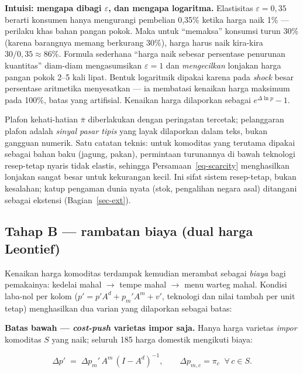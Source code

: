 \documentclass[
  manuscript=article,
  layout=publish,
  year=2026,
  volume=1,
]{den}
\begin{document}
\begin{intuisi}

\textbf{Intuisi: mengapa dibagi \(\varepsilon\), dan mengapa logaritma.}
Elastisitas \(\varepsilon = 0{,}35\) berarti konsumen hanya mengurangi
pembelian 0,35\% ketika harga naik 1\% --- perilaku khas bahan pangan
pokok. Maka untuk ``memaksa'' konsumsi turun 30\% (karena barangnya
memang berkurang 30\%), harga harus naik kira-kira
\(30/0{,}35 \approx 86\%\). Formula sederhana ``harga naik sebesar
persentase penurunan kuantitas'' diam-diam mengasumsikan
\(\varepsilon = 1\) dan \emph{mengecilkan} lonjakan harga pangan pokok
2--5 kali lipat. Bentuk logaritmik dipakai karena pada \emph{shock}
besar persentase aritmetika menyesatkan --- ia membatasi kenaikan harga
maksimum pada 100\%, batas yang artifisial. Kenaikan harga dilaporkan
sebagai \(e^{\Delta \ln p} - 1\).

\end{intuisi}

Plafon kehati-hatian \(\bar\pi\) diberlakukan dengan peringatan
tercetak; pelanggaran plafon adalah \emph{sinyal pasar tipis} yang layak
dilaporkan dalam teks, bukan gangguan numerik. Satu catatan teknis:
untuk komoditas yang terutama dipakai sebagai bahan baku (jagung,
pakan), permintaan turunannya di bawah teknologi resep-tetap nyaris
tidak elastis, sehingga Persamaan~\ref{eq-scarcity} menghasilkan
lonjakan sangat besar untuk kekurangan kecil. Ini sifat sistem
resep-tetap, bukan kesalahan; katup pengaman dunia nyata (stok,
pengalihan negara asal) ditangani sebagai ekstensi
(Bagian~\ref{sec-ext}).

\subsection{Tahap B --- rambatan biaya (dual harga
Leontief)}\label{tahap-b-rambatan-biaya-dual-harga-leontief}

Kenaikan harga komoditas terdampak kemudian merambat sebagai
\emph{biaya} bagi pemakainya: kedelai mahal \(\to\) tempe mahal \(\to\)
menu warteg mahal. Kondisi laba-nol per kolom
(\(p' = p'A^d + p_m'A^m + v'\), teknologi dan nilai tambah per unit
tetap) menghasilkan dua varian yang dilaporkan sebagai batas:

\textbf{Batas bawah --- \emph{cost-push} varietas impor saja.} Hanya
harga varietas \emph{impor} komoditas \(S\) yang naik; seluruh 185 harga
domestik mengikuti biaya:

\[
\Delta p' \;=\; \Delta p_m' \, A^m \, (I - A^d)^{-1},
\qquad \Delta p_{m,c} = \pi_c \;\; \forall\, c \in S .
\]
\end{document}
